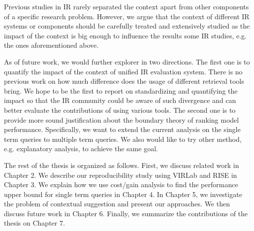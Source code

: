 Previous studies in IR rarely separated the context apart from other 
components of a specific research problem. However, we argue that the 
context of different IR systems or components should be carefully treated 
and extensively studied as the impact of the context is big enough to 
influence the results some IR studies, e.g. the ones aforementioned above.

As of future work, we would further explorer in two directions. 
The first one is to quantify the impact of the context of unified 
IR evaluation system. There is no previous work on how much difference does 
the usage of different retrieval tools bring.
We hope to be the first to report on standardizing and quantifying the 
impact so that the IR community could be aware of such divergence and can 
better evaluate the contributions of using various tools. 
The second one is to provide more sound justification about the boundary 
theory of ranking model performance. Specifically, we want to extend the 
current analysis on the single term queries to multiple term queries. 
We also would like to try other method, e.g. explanatory analysis, 
to achieve the same goal.

The rest of the thesis is organized as follows. First, we discuss related 
work in Chapter 2. We describe our reproducibility study using VIRLab and 
RISE in Chapter 3. We explain how we use cost/gain analysis to find the 
performance upper bound for single term queries in Chapter 4. 
In Chapter 5, we investigate the problem of contextual suggestion and 
present our approaches. We then discuss future work in Chapter 6. 
Finally, we summarize the contributions of the thesis on Chapter 7.
